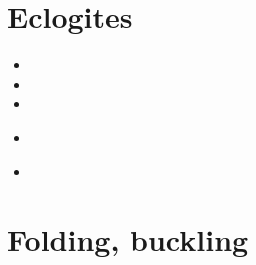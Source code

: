 \section{Eclogites} 

\begin{scriptsize}
\begin{itemize}
\item[\twothousandone] 
\item[\twothousandseven] 
\item[\twothousandnine] 
\item[\twothousandthirteen] 
 \\
\item[\twothousandtwentytwo] 
\\ 
\end{itemize}
\end{scriptsize}


\section{Folding, buckling} 

